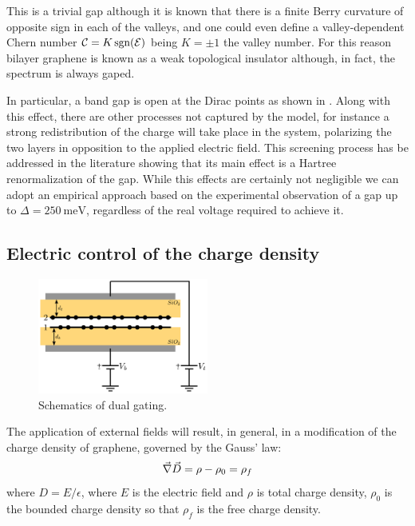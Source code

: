 This is a trivial gap although it is known that there is a finite Berry curvature of opposite sign in each of the valleys, and one could even define a valley-dependent Chern number\cite{Martin2008,San-Jose2009} $\mathcal{C}=K\operatorname{sgn}({\mathcal{E}})$ being $K=\pm1$ the valley number. For this reason bilayer graphene is known as a weak topological insulator although, in fact, the spectrum is always gaped.



In particular, a band gap is open at the Dirac points as shown in . Along with this effect, there are other processes not captured by the model, for instance a strong redistribution of the charge will take place in the system, polarizing the two layers in opposition to the applied electric field. This screening process has be addressed in the literature showing that its main effect is a Hartree renormalization of the gap\cite{McCann2006,Wang2016a}. While this effects are certainly not negligible we can adopt an empirical approach based on the experimental observation\cite{Zhang2009, Taychatanapat2010} of a gap up to $\Delta=\SI{250}{\meV}$, regardless of the real voltage required to achieve it.



\subsection{Electric control of the charge density}
\begin{figure}[h!]
\centering
\includegraphics[width=0.5\textwidth]{graphene_bilayer/figures/dual_gate.pdf}
\vspace{-5pt}
\caption{Schematics of dual gating.}
\label{dual_gate}
\end{figure}
\FloatBarrier
The application of external fields  will result, in general, in a modification of the charge density of graphene, governed by the Gauss' law:
\begin{equation}
   \vec{\nabla}\vec{D} = \rho-\rho_0 = \rho_f
\label{gauss}
\end{equation}
where $D=E/\epsilon$, where $E$ is the electric field and $\rho$ is total charge density, $\rho_0$ is the bounded charge density so that $\rho_f$ is the free charge density.

